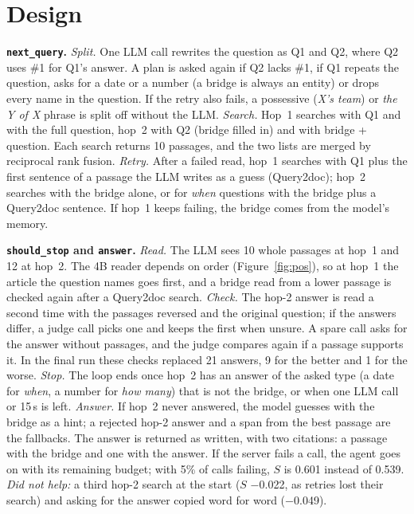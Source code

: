 \documentclass[10pt,a4paper]{article}
\begin{document}
\section{Design}
\textbf{\texttt{next\_query}.} \emph{Split.} One LLM call rewrites the question as Q1 and Q2, where Q2 uses \#1 for
Q1's answer. A plan is asked again if Q2 lacks \#1, if Q1 repeats the question, asks for a date or a number (a
bridge is always an entity) or drops every name in the question. If the retry also fails, a possessive
(\emph{X's team}) or \emph{the Y of X} phrase is split off without the LLM. \emph{Search.} Hop~1 searches with Q1
and with the full question, hop~2 with Q2 (bridge filled in) and with bridge + question. Each search returns 10
passages, and the two lists are merged by reciprocal rank fusion. \emph{Retry.} After a failed read, hop~1 searches
with Q1 plus the first sentence of a passage the LLM writes as a guess (Query2doc); hop~2 searches with the bridge
alone, or for \emph{when} questions with the bridge plus a Query2doc sentence. If hop~1 keeps failing, the bridge
comes from the model's memory.

\textbf{\texttt{should\_stop} and \texttt{answer}.} \emph{Read.} The LLM sees 10 whole passages at hop~1 and 12 at
hop~2. The 4B reader depends on order (Figure~\ref{fig:pos}), so at hop~1 the article the question names goes first,
and a bridge read from a lower passage is checked again after a Query2doc search. \emph{Check.} The hop-2 answer is
read a second time with the passages reversed and the original question; if the answers differ, a judge call picks
one and keeps the first when unsure. A spare call asks for the answer without passages, and the judge compares
again if a passage supports it. In the final run these checks replaced 21 answers, 9 for the better and 1 for the
worse. \emph{Stop.} The loop ends once hop~2 has an answer of the asked type (a date for \emph{when}, a number for
\emph{how many}) that is not the bridge, or when one LLM call or 15\,s is left. \emph{Answer.} If hop~2 never
answered, the model guesses with the bridge as a hint; a rejected hop-2 answer and a span from the best passage are
the fallbacks. The answer is returned as written, with two citations: a passage with the bridge and one with the
answer. If the server fails a call, the agent goes on with its remaining budget; with 5\% of calls failing, $S$ is
0.601 instead of 0.539.
\emph{Did not help:} a third hop-2 search at the start ($S$ $-$0.022, as retries lost their search) and asking for
the answer copied word for word ($-$0.049).
\end{document}
